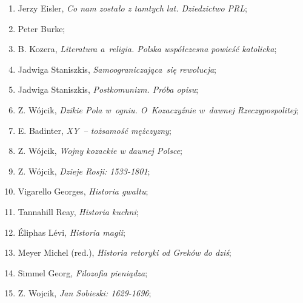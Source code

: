 \documentclass[a4paper,11pt]{article}
\begin{document}
\begin{enumerate}
\item Jerzy Eisler, \textit{Co nam zostało z tamtych lat. Dziedzictwo
    PRL};



\item Peter Burke;



\item B. Kozera, \textit{Literatura a~religia. Polska współczesna
    powieść katolicka};



\item Jadwiga Staniszkis, \textit{Samoograniczająca~się rewolucja};



\item Jadwiga Staniszkis, \textit{Postkomunizm. Próba opisu};



\item Z. Wójcik, \textit{Dzikie Pola w~ogniu. O~Kozaczyźnie w~dawnej
    Rzeczypospolitej};



\item E. Badinter, \textit{XY~-- tożsamość mężczyzny};



\item Z. Wójcik, \textit{Wojny kozackie w dawnej Polsce};



\item Z. Wójcik, \textit{Dzieje Rosji: 1533-1801};



\item Vigarello Georges, \textit{Historia gwałtu};



\item Tannahill Reay, \textit{Historia kuchni};



\item Éliphas Lévi, \textit{Historia magii};



\item Meyer Michel (red.), \textit{Historia retoryki od Greków do dziś};



\item Simmel Georg, \textit{Filozofia pieniądza};



\item Z. Wojcik, \textit{Jan Sobieski: 1629-1696};




\end{enumerate}
\end{document}
